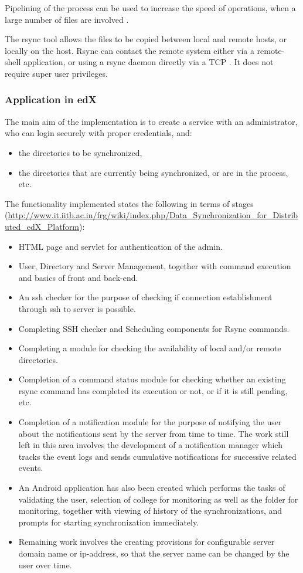 \documentclass[14pt]{article}
\begin{document}
Pipelining of the process can be used to increase the speed of operations, when a large number of files are involved \cite{tridgell1996rsync}.

The rsync tool allows the files to be copied between local and remote hosts, or locally on the host. Rsync can contact the remote system either via a remote-shell application, or using a rsync daemon directly via a TCP \cite{rsync}. It does not require super user privileges. 

\subsubsection{Application in edX}

The main aim of the implementation is to create a service with an administrator, who can login securely with proper credentials, and:
\begin{itemize}
\item the directories to be synchronized,
\item the directories that are currently being synchronized, or are in the process, etc.
\end{itemize}

The functionality implemented states the following in terms of stages (\url{http://www.it.iitb.ac.in/frg/wiki/index.php/Data_Synchronization_for_Distributed_edX_Platform}):

\begin{itemize}
\item HTML page and servlet for authentication of the admin.
\item User, Directory and Server Management, together with command execution and basics of front and back-end.
\item An ssh checker for the purpose of checking if connection establishment through ssh to server is possible.
\item Completing SSH checker and Scheduling components for Rsync commands.
\item Completing a module for checking the availability of local and/or remote directories.
\item Completion of a command status module for checking whether an existing rsync command has completed its execution or not, or if it is still pending, etc.
\item Completion of a notification module for the purpose of notifying the user about the notifications sent by the server from time to time. The work still left in this area involves the development of a notification manager which tracks the event logs and sends cumulative notifications for successive related events.
\item An Android application has also been created which performs the tasks of validating the user, selection of college for  monitoring as well as the folder for monitoring, together with viewing of history of the synchronizations, and prompts for starting synchronization immediately.
\item Remaining work involves the creating provisions for configurable server domain name or ip-address, so that the server name can be changed by the user over time.
\end{itemize}
\end{document}
